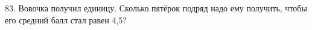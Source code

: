 83. Вовочка получил единицу. Сколько пятёрок подряд надо ему получить, чтобы его средний балл стал равен 4,5?\\
